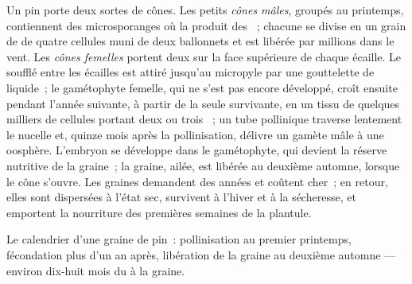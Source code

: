 \begin{proposition}\label{prop:b2:plant-life-cycles:conifer}
Un pin porte deux sortes de cônes. Les petits \emph{cônes mâles},
groupés au printemps, contiennent des microsporanges où la 
produit des ~; chacune se divise en un grain de  de
quatre cellules muni de deux ballonnets et est libérée par millions
dans le vent. Les \emph{cônes femelles} portent deux  sur la face
supérieure de chaque écaille. Le  soufflé entre les écailles est
attiré jusqu'au micropyle par une gouttelette de liquide~; le
gamétophyte femelle, qui ne s'est pas encore développé, croît ensuite
pendant l'année suivante, à partir de la seule  survivante,
en un tissu de quelques milliers de cellules portant deux ou trois
~; un tube pollinique traverse lentement le nucelle et, quinze
mois après la pollinisation, délivre un gamète mâle à une oosphère.
L'embryon se développe dans le gamétophyte, qui devient la réserve
nutritive de la graine~; la graine, ailée, est libérée au deuxième
automne, lorsque le cône s'ouvre. Les graines demandent des années et
coûtent cher~; en retour, elles sont dispersées à l'état sec, survivent
à l'hiver et à la sécheresse, et emportent la nourriture des premières
semaines de la plantule.
\end{proposition}

\begin{omfigure}

{\small Le calendrier d'une graine de pin~: pollinisation au premier
printemps, fécondation plus d'un an après, libération de la graine au
deuxième automne --- environ dix-huit mois du  à la graine.}
\end{omfigure}

